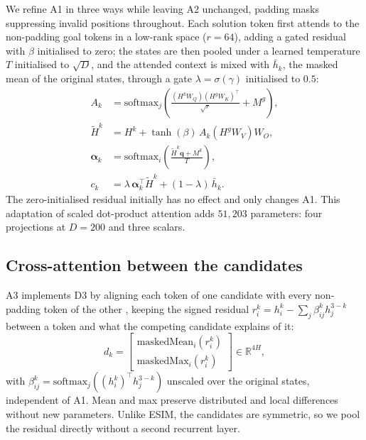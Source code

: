 \documentclass[11pt]{article}
\begin{document}
We refine A1 in three ways while leaving A2 unchanged, padding masks
suppressing invalid positions throughout. Each solution token first attends to
the non-padding goal tokens in a low-rank space ($r = 64$), adding a gated
residual with $\beta$ initialised to zero; the states are then pooled under a
learned temperature $T$ initialised to $\sqrt{D}$, and the attended context is
mixed with $\bar{h}_k$, the masked mean of the original states, through a gate
$\lambda = \sigma(\gamma)$ initialised to $0.5$:
\begin{align}
A_k &= \mathrm{softmax}_j\!\left(
   \tfrac{(H^{k}W_{Q})(H^{g}W_{K})^{\!\top}}{\sqrt{r}}
   + M^{g}\right), \nonumber\\
\widetilde{H}^{k} &= H^{k} + \tanh(\beta)\,A_k\!\left(H^{g}W_{V}\right)W_{O},
   \nonumber\\
\boldsymbol{\alpha}_k &= \mathrm{softmax}_i\!\left(
   \tfrac{\widetilde{H}^{k}\mathbf{q} + M^{k}}{T}\right), \nonumber\\
c_k &= \lambda\,\boldsymbol{\alpha}_k^{\!\top}\widetilde{H}^{k}
       + (1-\lambda)\,\bar{h}_k .
\label{eq:refine}
\end{align}
The zero-initialised residual initially has no effect and only changes A1.
This adaptation of scaled dot-product attention \citep{vaswani2017attention}
adds $51{,}203$ parameters: four projections at $D=200$ and three scalars.

\subsection{Cross-attention between the candidates}
\label{sec:cross}

A3 implements D3 by aligning each token of one candidate with every
non-padding token of the other \citep{chen2017esim}, keeping the signed
residual $r^{k}_{i} = h^{k}_{i} - \sum_j \beta^{k}_{ij} h^{3-k}_{j}$ between a
token and what the competing candidate explains of it:
\begin{equation}
d_k = \left[\begin{array}{c}
  \mathrm{maskedMean}_i(r^{k}_{i})\\[-1pt]
  \mathrm{maskedMax}_i(r^{k}_{i})
\end{array}\right] \in \mathbb{R}^{4H},
\label{eq:residual}
\end{equation}
with $\beta^{k}_{ij}=\mathrm{softmax}_j((h^{k}_{i})^{\!\top}h^{3-k}_{j})$
unscaled over the original states, independent of A1. Mean and max preserve
distributed and local differences without new parameters. Unlike ESIM, the
candidates are symmetric, so we pool the residual directly without a second
recurrent layer.
\end{document}
